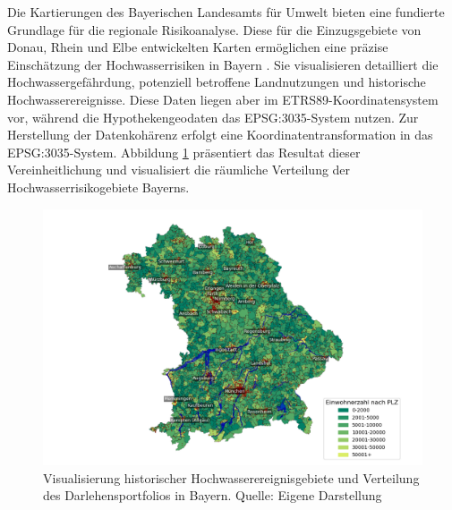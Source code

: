 Die Kartierungen des Bayerischen Landesamts für Umwelt bieten eine fundierte Grundlage für die regionale Risikoanalyse. Diese für die Einzugsgebiete von Donau, Rhein und Elbe entwickelten Karten ermöglichen eine präzise Einschätzung der Hochwasserrisiken in Bayern \parencite{LfU_Bayern}. Sie visualisieren detailliert die Hochwassergefährdung, potenziell betroffene Landnutzungen und historische Hochwasserereignisse.
Diese Daten liegen aber im ETRS89-Koordinatensystem vor, während die Hypothekengeodaten das EPSG:3035-System nutzen. Zur Herstellung der Datenkohärenz erfolgt eine Koordinatentransformation in das EPSG:3035-System. Abbildung \ref{fig:bayernflut} präsentiert das Resultat dieser Vereinheitlichung und visualisiert die räumliche Verteilung der Hochwasserrisikogebiete Bayerns.
\begin{figure}[htbp]
    \centering
    \includegraphics[width=\textwidth]{figures/bayern_flut.png} 
    \caption{Visualisierung historischer Hochwasserereignisgebiete und Verteilung des Darlehensportfolios in Bayern. Quelle: Eigene Darstellung}
    \label{fig:bayernflut}
\end{figure}
\FloatBarrier


